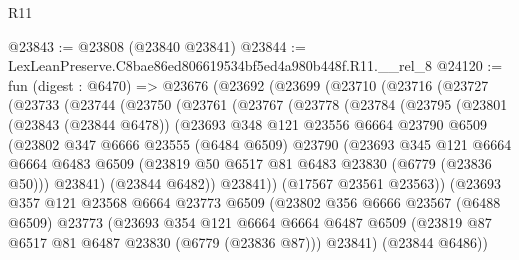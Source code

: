 \begin{lexlean}{R11}
\begin{coremodule}
@23843 := @23808 (@23840 @23841)
@23844 := LexLeanPreserve.C8bae86ed806619534bf5ed4a980b448f.R11.__rel_8
@24120 := fun (digest : @6470) =>
  @23676
    (@23692
      (@23699
        (@23710
          (@23716
            (@23727
              (@23733
                (@23744
                  (@23750
                    (@23761
                      (@23767
                        (@23778
                          (@23784
                            (@23795
                              (@23801
                                (@23843 (@23844 @6478))
                                (@23693
                                  @348
                                  @121
                                  @23556
                                  @6664
                                  @23790
                                  @6509
                                  (@23802
                                    @347
                                    @6666
                                    @23555
                                    (@6484 @6509)
                                    @23790
                                    (@23693
                                      @345
                                      @121
                                      @6664
                                      @6664
                                      @6483
                                      @6509
                                      (@23819 @50 @6517 @81 @6483 @23830 (@6779 (@23836 @50)))
                                      @23841)
                                    (@23844 @6482))
                                  @23841))
                              (@17567 @23561 @23563))
                            (@23693
                              @357
                              @121
                              @23568
                              @6664
                              @23773
                              @6509
                              (@23802
                                @356
                                @6666
                                @23567
                                (@6488 @6509)
                                @23773
                                (@23693
                                  @354
                                  @121
                                  @6664
                                  @6664
                                  @6487
                                  @6509
                                  (@23819 @87 @6517 @81 @6487 @23830 (@6779 (@23836 @87)))
                                  @23841)
                                (@23844 @6486))

\end{coremodule}
\end{lexlean}
